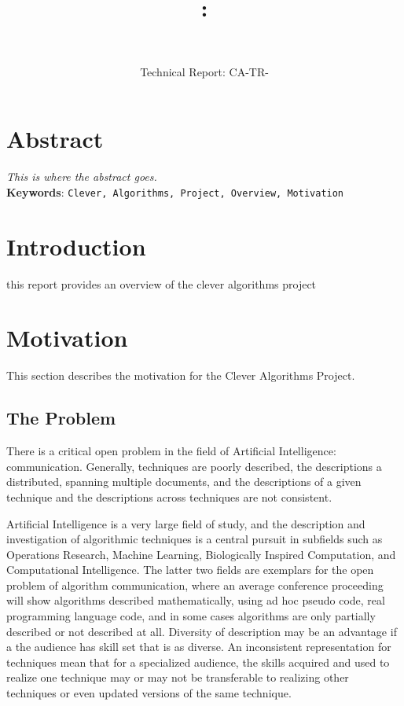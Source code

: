 \documentclass[a4paper, 11pt]{article}
\title{{\myreporttitle}: {\myreportsubtitle}\\{\normalsize\myreportproject}}
\author{\myreportname\\\myreportemail}
\date{Technical Report: CA-TR-\myreportdate}
\begin{document}
\maketitle

\section*{Abstract} 
\label{sec:abstract}
\emph{This is where the abstract goes.}
\\
\textbf{Keywords}: \texttt{Clever, Algorithms, Project, Overview, Motivation}

\section{Introduction}
\label{sec:introduction}

this report provides an overview of the clever algorithms project

\section{Motivation}
This section describes the motivation for the Clever Algorithms Project.

\subsection{The Problem}
There is a critical open problem in the field of Artificial Intelligence: communication. Generally, techniques are poorly described, the descriptions a distributed, spanning multiple documents, and the descriptions of a given technique and the descriptions across techniques are not consistent. 

Artificial Intelligence is a very large field of study, and the description and investigation of algorithmic techniques is a central pursuit in subfields such as Operations Research, Machine Learning, Biologically Inspired Computation, and Computational Intelligence. The latter two fields are exemplars for the open problem of algorithm communication, where an average conference proceeding will show algorithms described mathematically, using ad hoc pseudo code, real programming language code, and in some cases algorithms are only partially described or not described at all. Diversity of description may be an advantage if a the audience has skill set that is as diverse. An inconsistent representation for techniques mean that for a specialized audience, the skills acquired and used to realize one technique may or may not be transferable to realizing other techniques or even updated versions of the same technique.
\end{document}
